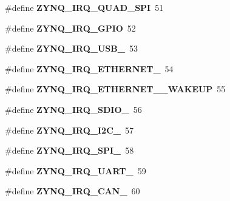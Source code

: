 \begin{DoxyCompactItemize}
\#define {\bfseries Z\+Y\+N\+Q\+\_\+\+I\+R\+Q\+\_\+\+Q\+U\+A\+D\+\_\+\+S\+PI}~51
\item 
\mbox{\label{group__zynq__interrupt_ga0b6db95dab7838fbe4a5db3cd1dc02d9}} 
\#define {\bfseries Z\+Y\+N\+Q\+\_\+\+I\+R\+Q\+\_\+\+G\+P\+IO}~52
\item 
\mbox{\label{group__zynq__interrupt_gafe96721a57570287b5ae165082431c87}} 
\#define {\bfseries Z\+Y\+N\+Q\+\_\+\+I\+R\+Q\+\_\+\+U\+S\+B\+\_}~53
\item 
\mbox{\label{group__zynq__interrupt_ga93a2d0d12bb6660d1fb7ce9ed9411dfa}} 
\#define {\bfseries Z\+Y\+N\+Q\+\_\+\+I\+R\+Q\+\_\+\+E\+T\+H\+E\+R\+N\+E\+T\+\_}~54
\item 
\mbox{\label{group__zynq__interrupt_gad4e86eec8ae0d794f957aa2dbcf3a955}} 
\#define {\bfseries Z\+Y\+N\+Q\+\_\+\+I\+R\+Q\+\_\+\+E\+T\+H\+E\+R\+N\+E\+T\+\_\+\_\+\+W\+A\+K\+E\+UP}~55
\item 
\mbox{\label{group__zynq__interrupt_ga8218f62d04955454427ccd7c543ac158}} 
\#define {\bfseries Z\+Y\+N\+Q\+\_\+\+I\+R\+Q\+\_\+\+S\+D\+I\+O\+\_}~56
\item 
\mbox{\label{group__zynq__interrupt_ga351aa13f1753e49c6f844b50fb5f1c5a}} 
\#define {\bfseries Z\+Y\+N\+Q\+\_\+\+I\+R\+Q\+\_\+\+I2\+C\+\_}~57
\item 
\mbox{\label{group__zynq__interrupt_gaf33ce7c2b73d4630d082c95b8432e181}} 
\#define {\bfseries Z\+Y\+N\+Q\+\_\+\+I\+R\+Q\+\_\+\+S\+P\+I\+\_}~58
\item 
\mbox{\label{group__zynq__interrupt_ga3503b4cbe5a6add85221dc52fb7657f6}} 
\#define {\bfseries Z\+Y\+N\+Q\+\_\+\+I\+R\+Q\+\_\+\+U\+A\+R\+T\+\_}~59
\item 
\mbox{\label{group__zynq__interrupt_gaec02561e93d927e39c1951265c9a85b0}} 
\#define {\bfseries Z\+Y\+N\+Q\+\_\+\+I\+R\+Q\+\_\+\+C\+A\+N\+\_}~60
\item 
\mbox{\label{group__zynq__interrupt_gad39a6d3be7a01ea0bae404d7efbd5e24}} 

\end{DoxyCompactItemize}
